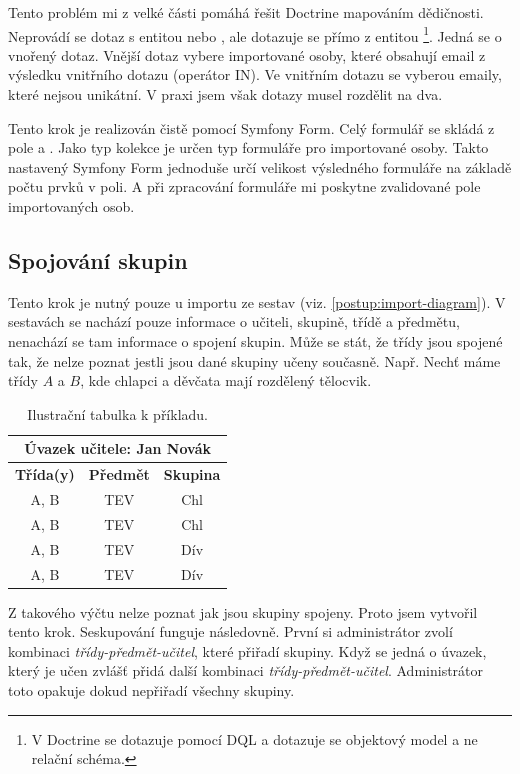 Tento problém mi z velké části pomáhá řešit Doctrine mapováním dědičnosti.
Neprovádí se dotaz s entitou  nebo , ale dotazuje se přímo z entitou \footnote{V Doctrine se dotazuje pomocí DQL a dotazuje se objektový model a ne relační schéma.}.
Jedná se o vnořený dotaz.
Vnější dotaz vybere importované osoby, které obsahují email z výsledku vnitřního dotazu (operátor \textsc{IN}).
Ve vnitřním dotazu se vyberou emaily, které nejsou unikátní. V praxi jsem však dotazy musel rozdělit na dva.

Tento krok je realizován čistě pomocí Symfony Form. Celý formulář se skládá z pole  a .
  Jako typ kolekce je určen typ formuláře pro importované osoby. Takto nastavený Symfony Form jednoduše určí velikost výsledného formuláře na základě počtu prvků v poli. A při zpracování formuláře mi poskytne zvalidované pole importovaných osob.

\subsection{Spojování skupin}\label{postup:spojovani-skupin}

Tento krok je nutný pouze u importu ze sestav (viz. \ref{postup:import-diagram}).
V sestavách se nachází pouze informace o učiteli, skupině, třídě a předmětu, nenachází se tam informace o spojení skupin.
Může se stát, že třídy jsou spojené tak, že nelze poznat jestli jsou dané skupiny učeny současně.
Např. Nechť máme třídy $A$ a $B$, kde chlapci a děvčata mají rozdělený tělocvik.

\begin{table}[h!]
\centering
\begin{tabular}{ | c | c | c | }
\hline
 \multicolumn{3}{|c|}{\textbf{Úvazek učitele:} Jan Novák}\\
     \hline
 \textbf{Třída(y)} & \textbf{Předmět} & \textbf{Skupina}\\
 \hline
 A, B & TEV & Chl \\ 
 \hline
 A, B & TEV & Chl \\  
 \hline
 A, B & TEV & Dív \\ 
 \hline
 A, B & TEV & Dív \\  
 \hline
\end{tabular}
\caption{Ilustrační tabulka k příkladu.}
\end{table}

Z takového výčtu nelze poznat jak jsou skupiny spojeny.
Proto jsem vytvořil tento krok. 
Seskupování funguje následovně.
První si administrátor zvolí kombinaci \textit{třídy-předmět-učitel}, které přiřadí skupiny. 
Když se jedná o úvazek, který je učen zvlášť přidá další kombinaci \textit{třídy-předmět-učitel}. Administrátor toto opakuje dokud nepřiřadí všechny skupiny.

